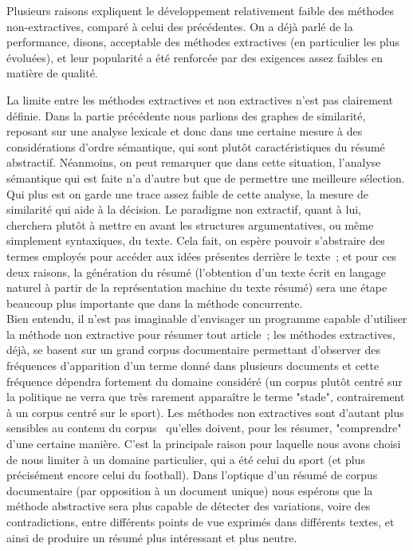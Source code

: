 \documentclass[a4paper, 12pt]{article}
\begin{document}
Plusieurs raisons expliquent le développement relativement faible des méthodes non-extractives, comparé à celui des précédentes. On a déjà parlé de la performance, disons, acceptable des méthodes extractives (en particulier les plus évoluées), et leur popularité a été renforcée par des exigences assez faibles en matière de qualité. %

La limite entre les méthodes extractives et non extractives n'est pas clairement définie. Dans la partie précédente nous parlions des graphes de similarité, reposant sur une analyse lexicale et donc dans une certaine mesure à des considérations d'ordre sémantique, qui sont plutôt caractéristiques du résumé abstractif. Néanmoins, on peut remarquer que dans cette situation, l'analyse sémantique qui est faite n'a d'autre but que de permettre une meilleure sélection. Qui plus est on garde une trace assez faible de cette analyse, la mesure de similarité qui aide à la décision. Le paradigme non extractif, quant à lui, cherchera plutôt à mettre en avant les structures argumentatives, ou même simplement syntaxiques, du texte. Cela fait, on espère pouvoir s'abstraire des termes employés pour accéder aux idées présentes derrière le texte~; et pour ces deux raisons, la génération du résumé (l'obtention d'un texte écrit en langage naturel à partir de la représentation machine du texte résumé) sera une étape beaucoup plus importante que dans la méthode concurrente.\\

Bien entendu, il n'est pas imaginable d'envisager un programme capable d'utiliser la méthode non extractive pour résumer tout article~; les méthodes extractives, déjà, se basent sur un grand corpus documentaire permettant d'observer des fréquences d'apparition d'un terme donné dans plusieurs documents et cette fréquence dépendra fortement du domaine considéré (un corpus plutôt centré sur la politique ne verra que très rarement apparaître le terme "stade", contrairement à un corpus centré sur le sport). Les méthodes non extractives sont d'autant plus sensibles au contenu du corpus~\cite[p.1774]{jones_automatic_2007} qu'elles doivent, pour les résumer, "comprendre" d'une certaine manière. C'est la principale raison pour laquelle nous avons choisi de nous limiter à un domaine particulier, qui a été celui du sport (et plus précisément encore celui du football). Dans l'optique d'un résumé de corpus documentaire (par opposition à un document unique) nous espérons que la méthode abstractive sera plus capable de détecter des variations, voire des contradictions, entre différents points de vue exprimés dans différents textes, et ainsi de produire un résumé plus intéressant et plus neutre.\\
\end{document}
